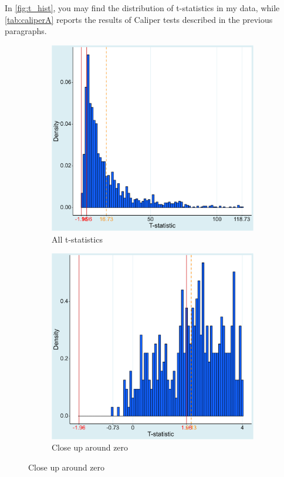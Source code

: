 In \autoref{fig:t_hist}, you may find the distribution of t-statistics in my data, while \autoref{tab:caliperA} reports the results of Caliper tests described in the previous paragraphs.

\begin{figure}[!b]
\centering
\caption{The distribution of t-statistics is heavily skewed}
\label{fig:t_hist}
\begin{subfigure}[b]{0.45\textwidth}
  \caption{All t-statistics}
  \includegraphics[width=0.95\linewidth]{Figures/t_hist.png}
\end{subfigure}
\begin{subfigure}[b]{0.45\textwidth}
  \caption{Close up around zero}
  \includegraphics[width=0.95\linewidth]{Figures/t_hist_closeup.png}

\end{subfigure}
\end{figure}
